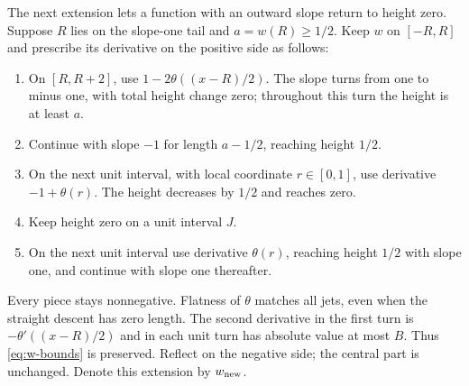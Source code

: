 \documentclass[11pt,a4paper]{article}
\begin{document}
The next extension lets a function with an outward slope return to height
zero. Suppose $R$ lies on the slope-one tail and $a=w(R)\geq1/2$. Keep $w$
on $[-R,R]$ and prescribe its derivative on the positive side as follows:
\begin{enumerate}
\item On $[R,R+2]$, use $1-2\theta((x-R)/2)$. The slope turns from one
to minus one, with total height change zero; throughout this turn the height
is at least $a$.
\item Continue with slope $-1$ for length $a-1/2$, reaching height $1/2$.
\item On the next unit interval, with local coordinate $r\in[0,1]$, use
derivative $-1+\theta(r)$. The height decreases by $1/2$ and reaches zero.
\item Keep height zero on a unit interval $J$.
\item On the next unit interval use derivative $\theta(r)$, reaching
height $1/2$ with slope one, and continue with slope one thereafter.
\end{enumerate}
Every piece stays nonnegative. Flatness of $\theta$ matches all jets, even
when the straight descent has zero length. The second derivative in the
first turn is $-\theta'((x-R)/2)$ and in each unit turn has absolute value
at most $B$. Thus \eqref{eq:w-bounds} is preserved. Reflect on the negative
side; the central part is unchanged. Denote this extension by $w_{\rm new}$.
\end{document}
